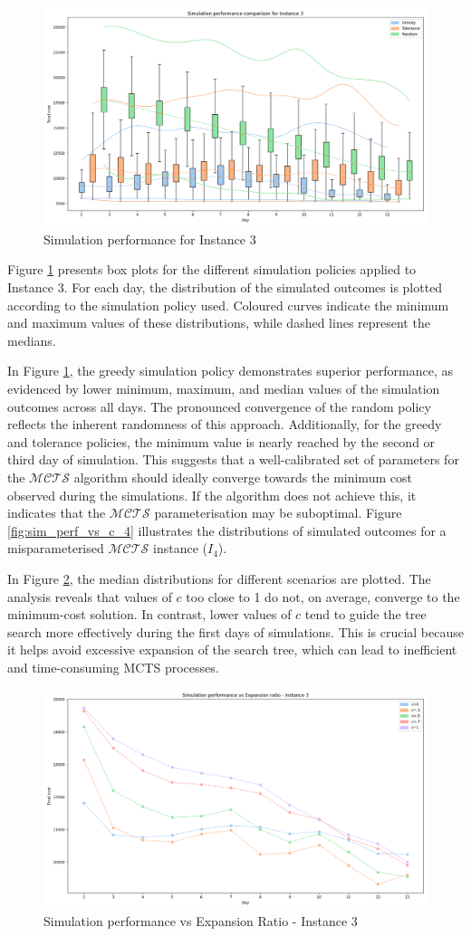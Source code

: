 \begin{figure}[!ht]
    \centering
    \includegraphics[width=.4\textwidth]{Figures/3 - Simulation performance.png}
    \caption{Simulation performance for Instance 3}
    \label{fig:sim_perf_3}
\end{figure}

Figure \ref{fig:sim_perf_3} presents box plots for the different simulation policies applied to Instance 3. For each day, the distribution of the simulated outcomes is plotted according to the simulation policy used. Coloured curves indicate the minimum and maximum values of these distributions, while dashed lines represent the medians.

In Figure \ref{fig:sim_perf_3}, the greedy simulation policy demonstrates superior performance, as evidenced by lower minimum, maximum, and median values of the simulation outcomes across all days. The pronounced convergence of the random policy reflects the inherent randomness of this approach. Additionally, for the greedy and tolerance policies, the minimum value is nearly reached by the second or third day of simulation. This suggests that a well-calibrated set of parameters for the $\mathcal{MCTS}$ algorithm should ideally converge towards the minimum cost observed during the simulations. If the algorithm does not achieve this, it indicates that the $\mathcal{MCTS}$ parameterisation may be suboptimal. 
Figure \ref{fig:sim_perf_vs_c_4} illustrates the distributions of simulated outcomes for a misparameterised $\mathcal{MCTS}$ instance ($I_4$). 

In Figure \ref{fig:sim_perf_vs_c_3}, the median distributions for different scenarios are plotted. The analysis reveals that values of $c$ too close to 1 do not, on average, converge to the minimum-cost solution. In contrast, lower values of $c$ tend to guide the tree search more effectively during the first days of simulations. This is crucial because it helps avoid excessive expansion of the search tree, which can lead to inefficient and time-consuming MCTS processes.

\begin{figure}[!ht]
    \centering
    \includegraphics[width=.4\textwidth]{Figures/3 - Simulation performance vs Expansion ratio.png}
    \caption{Simulation performance vs Expansion Ratio - Instance 3}
    \label{fig:sim_perf_vs_c_3}
\end{figure}

